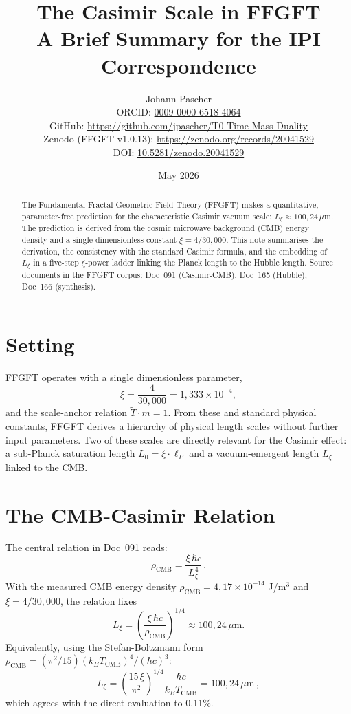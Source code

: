 \documentclass[11pt,a4paper]{article}
\title{The Casimir Scale in FFGFT\\[2pt]
  \large A Brief Summary for the IPI Correspondence}
\author{Johann Pascher\\[2pt]
\small ORCID: \href{https://orcid.org/0009-0000-6518-4064}{0009-0000-6518-4064}\\
\small GitHub: \url{https://github.com/jpascher/T0-Time-Mass-Duality}\\
\small Zenodo (FFGFT v1.0.13): \url{https://zenodo.org/records/20041529}\\
\small DOI: \href{https://doi.org/10.5281/zenodo.20041529}{10.5281/zenodo.20041529}}
\date{May 2026}
\begin{document}
\maketitle

\begin{abstract}
\noindent The Fundamental Fractal Geometric Field Theory (FFGFT) makes a quantitative, parameter-free prediction for the characteristic Casimir vacuum scale: $L_\xi \approx 100{,}24\,\mu$m. The prediction is derived from the cosmic microwave background (CMB) energy density and a single dimensionless constant $\xi = 4/30{,}000$. This note summarises the derivation, the consistency with the standard Casimir formula, and the embedding of $L_\xi$ in a five-step $\xi$-power ladder linking the Planck length to the Hubble length. Source documents in the FFGFT corpus: Doc~091 (Casimir-CMB), Doc~165 (Hubble), Doc~166 (synthesis).
\end{abstract}

\section{Setting}

FFGFT operates with a single dimensionless parameter,
\[
\xi = \frac{4}{30{,}000} = 1{,}333 \times 10^{-4},
\]
and the scale-anchor relation $\tilde T \cdot m = 1$. From these and standard physical constants, FFGFT derives a hierarchy of physical length scales without further input parameters. Two of these scales are directly relevant for the Casimir effect: a sub-Planck saturation length $L_0 = \xi \cdot \ell_P$ and a vacuum-emergent length $L_\xi$ linked to the CMB.

\section{The CMB-Casimir Relation}

The central relation in Doc~091 reads:
\begin{equation}
\rho_{\mathrm{CMB}} = \frac{\xi \, \hbar c}{L_\xi^4}\,.
\label{eq:cmb_casimir}
\end{equation}
With the measured CMB energy density $\rho_{\mathrm{CMB}} = 4{,}17 \times 10^{-14}$ J/m$^3$ and $\xi = 4/30{,}000$, the relation fixes
\begin{equation}
L_\xi = \left(\frac{\xi\,\hbar c}{\rho_{\mathrm{CMB}}}\right)^{1/4} \approx 100{,}24\,\mu\text{m}.
\label{eq:Lxi_value}
\end{equation}
Equivalently, using the Stefan-Boltzmann form $\rho_{\mathrm{CMB}} = (\pi^2/15)(k_B T_{\mathrm{CMB}})^4 / (\hbar c)^3$:
\begin{equation}
L_\xi = \left(\frac{15\,\xi}{\pi^2}\right)^{1/4} \frac{\hbar c}{k_B T_{\mathrm{CMB}}} = 100{,}24\,\mu\text{m}\,,
\label{eq:Lxi_from_T}
\end{equation}
which agrees with the direct evaluation to 0.11\%.
\end{document}
